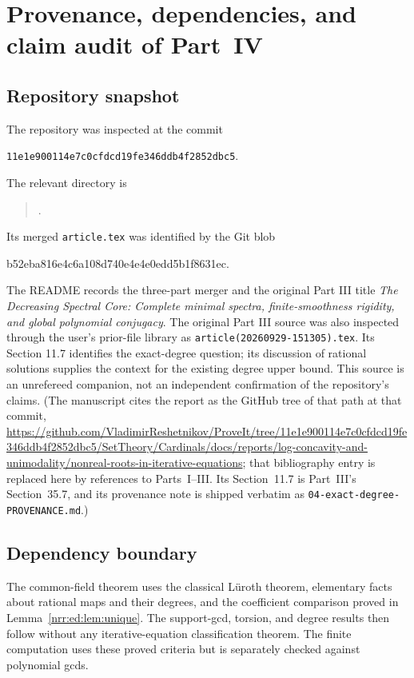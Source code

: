\documentclass[11pt,letterpaper]{article}
\theoremstyle{definition}
\theoremstyle{remark}
\begin{document}
\section{Provenance, dependencies, and claim audit of Part~IV}
\label{nrr:ed:app:provenance}

\subsection{Repository snapshot}

The repository was inspected at the commit
\begin{center}
\small\texttt{11e1e900114e7c0cfdcd19fe346ddb4f2852dbc5}.
\end{center}
The relevant directory is
\begin{quote}\small\ttfamily
{}.
\end{quote}
Its merged \texttt{article.tex} was identified by the Git blob
\begin{center}\small\ttfamily
b52eba816e4c6a108d740e4e4e0edd5b1f8631ec.
\end{center}
The README records the three-part merger and the original Part III title
\emph{The Decreasing Spectral Core: Complete minimal spectra, finite-smoothness
rigidity, and global polynomial conjugacy}. The original Part III source was
also inspected through the user's prior-file library as
\texttt{article(20260929-151305).tex}. Its Section 11.7 identifies the exact-degree
question; its discussion of rational solutions supplies the context for the
existing degree upper bound. This source is an unrefereed companion, not an
independent confirmation of the repository's claims.
(The manuscript cites the report as the GitHub tree of that path at that commit,
\url{https://github.com/VladimirReshetnikov/ProveIt/tree/11e1e900114e7c0cfdcd19fe346ddb4f2852dbc5/SetTheory/Cardinals/docs/reports/log-concavity-and-unimodality/nonreal-roots-in-iterative-equations};
that bibliography entry is replaced here by references to Parts~I--III. Its
Section~11.7 is Part~III's Section~35.7, and its provenance note is shipped
verbatim as \nolinkurl{04-exact-degree-PROVENANCE.md}.)

\subsection{Dependency boundary}

The common-field theorem uses the classical L\"uroth theorem, elementary facts
about rational maps and their degrees, and the coefficient comparison proved in
Lemma~\ref{nrr:ed:lem:unique}. The support-gcd, torsion, and degree results then follow
without any iterative-equation classification theorem. The finite computation
uses these proved criteria but is separately checked against polynomial gcds.
\end{document}
